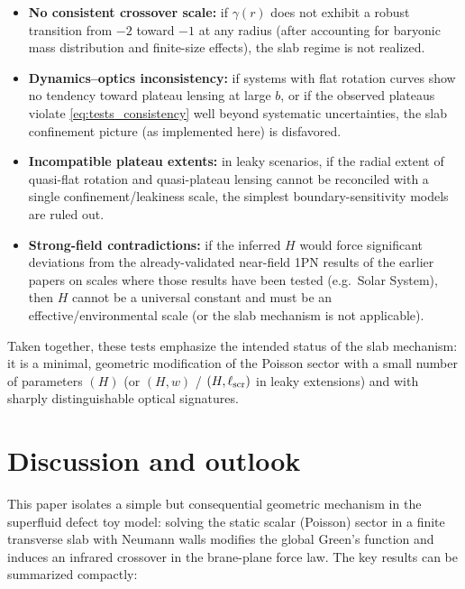 \documentclass[11pt]{article}
\begin{document}
\begin{itemize}
\item \textbf{No consistent crossover scale:} if $\gamma(r)$ does not exhibit a robust transition
      from $-2$ toward $-1$ at any radius (after accounting for baryonic mass distribution and
      finite-size effects), the slab regime is not realized.

\item \textbf{Dynamics--optics inconsistency:} if systems with flat rotation curves show no tendency
      toward plateau lensing at large $b$, or if the observed plateaus violate
      \eqref{eq:tests_consistency} well beyond systematic uncertainties, the slab confinement picture
      (as implemented here) is disfavored.

\item \textbf{Incompatible plateau extents:} in leaky scenarios, if the radial extent of quasi-flat
      rotation and quasi-plateau lensing cannot be reconciled with a single confinement/leakiness
      scale, the simplest boundary-sensitivity models are ruled out.

\item \textbf{Strong-field contradictions:} if the inferred $H$ would force significant deviations
      from the already-validated near-field 1PN results of the earlier papers on scales where those
      results have been tested (e.g.\ Solar System), then $H$ cannot be a universal constant and must
      be an effective/environmental scale (or the slab mechanism is not applicable).
\end{itemize}

Taken together, these tests emphasize the intended status of the slab mechanism: it is a minimal,
geometric modification of the Poisson sector with a small number of parameters $(H)$ (or $(H,w)$ /
$(H,\ell_{\rm scr})$ in leaky extensions) and with sharply distinguishable optical signatures.

\section{Discussion and outlook}
\label{sec:discussion}

This paper isolates a simple but consequential geometric mechanism in the superfluid defect toy
model: solving the static scalar (Poisson) sector in a finite transverse slab with Neumann walls
modifies the global Green's function and induces an infrared crossover in the brane-plane force law.
The key results can be summarized compactly:
\end{document}
